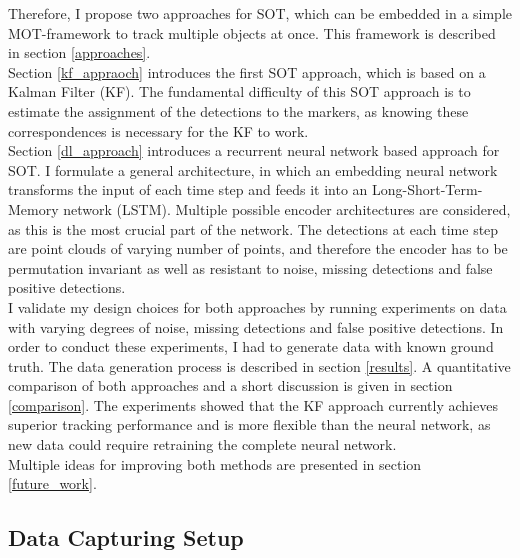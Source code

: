 \documentclass{article}
\begin{document}
Therefore, I propose two approaches for SOT, which can be embedded in a simple MOT-framework to track multiple objects at once. This framework is described in section \ref{approaches}. \\
Section \ref{kf_appraoch} introduces the first SOT approach, which is based on a Kalman Filter (KF). The fundamental difficulty of this SOT approach is to estimate the assignment of the detections to the markers, as knowing these correspondences is necessary for the KF to work.
\\
Section \ref{dl_approach} introduces a recurrent neural network based approach for SOT. I formulate a general architecture, in which an embedding neural network transforms the input of each time step and feeds it into an Long-Short-Term-Memory  network (LSTM). Multiple possible encoder architectures are considered, as this is the most crucial part of the network. The detections at each time step are point clouds of varying number of points, and therefore the encoder has to be permutation invariant as well as resistant to noise, missing detections and false positive detections.\\
I validate my design choices for both approaches by running experiments on data with varying degrees of noise, missing detections and false positive detections. In order to conduct these experiments, I had to generate data with known ground truth. The data generation process is described in section \ref{results}. A quantitative comparison of both approaches and a short discussion is given in section \ref{comparison}. The experiments showed that the KF approach currently achieves superior tracking performance and is more flexible than the neural network, as new data could require retraining the complete neural network. %
\\
Multiple ideas for improving both methods are presented in section \ref{future_work}. %







\subsection{Data Capturing Setup}
\label{data_setup}
\end{document}
